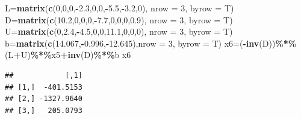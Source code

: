 \documentclass[
]{article}
\newenvironment{Shaded}{\begin{snugshade}}{\end{snugshade}}
\newcommand{\AttributeTok}[1]{\textcolor[rgb]{0.13,0.29,0.53}{#1}}
\newcommand{\DecValTok}[1]{\textcolor[rgb]{0.00,0.00,0.81}{#1}}
\newcommand{\FloatTok}[1]{\textcolor[rgb]{0.00,0.00,0.81}{#1}}
\newcommand{\FunctionTok}[1]{\textcolor[rgb]{0.13,0.29,0.53}{\textbf{#1}}}
\newcommand{\NormalTok}[1]{#1}
\newcommand{\OtherTok}[1]{\textcolor[rgb]{0.56,0.35,0.01}{#1}}
\newcommand{\SpecialCharTok}[1]{\textcolor[rgb]{0.81,0.36,0.00}{\textbf{#1}}}
\begin{document}
\begin{Shaded}
\begin{Highlighting}[]
\NormalTok{  L}\OtherTok{=}\FunctionTok{matrix}\NormalTok{(}\FunctionTok{c}\NormalTok{(}\DecValTok{0}\NormalTok{,}\DecValTok{0}\NormalTok{,}\DecValTok{0}\NormalTok{,}\SpecialCharTok{{-}}\FloatTok{2.3}\NormalTok{,}\DecValTok{0}\NormalTok{,}\DecValTok{0}\NormalTok{,}\SpecialCharTok{{-}}\FloatTok{5.5}\NormalTok{,}\SpecialCharTok{{-}}\FloatTok{3.2}\NormalTok{,}\DecValTok{0}\NormalTok{), }\AttributeTok{nrow =} \DecValTok{3}\NormalTok{, }\AttributeTok{byrow =}\NormalTok{ T)}
\NormalTok{  D}\OtherTok{=}\FunctionTok{matrix}\NormalTok{(}\FunctionTok{c}\NormalTok{(}\FloatTok{10.2}\NormalTok{,}\DecValTok{0}\NormalTok{,}\DecValTok{0}\NormalTok{,}\DecValTok{0}\NormalTok{,}\SpecialCharTok{{-}}\FloatTok{7.7}\NormalTok{,}\DecValTok{0}\NormalTok{,}\DecValTok{0}\NormalTok{,}\DecValTok{0}\NormalTok{,}\FloatTok{0.9}\NormalTok{), }\AttributeTok{nrow =} \DecValTok{3}\NormalTok{, }\AttributeTok{byrow =}\NormalTok{ T)}
\NormalTok{  U}\OtherTok{=}\FunctionTok{matrix}\NormalTok{(}\FunctionTok{c}\NormalTok{(}\DecValTok{0}\NormalTok{,}\FloatTok{2.4}\NormalTok{,}\SpecialCharTok{{-}}\FloatTok{4.5}\NormalTok{,}\DecValTok{0}\NormalTok{,}\DecValTok{0}\NormalTok{,}\FloatTok{11.1}\NormalTok{,}\DecValTok{0}\NormalTok{,}\DecValTok{0}\NormalTok{,}\DecValTok{0}\NormalTok{), }\AttributeTok{nrow =} \DecValTok{3}\NormalTok{, }\AttributeTok{byrow =}\NormalTok{ T)}
\NormalTok{  b}\OtherTok{=}\FunctionTok{matrix}\NormalTok{(}\FunctionTok{c}\NormalTok{(}\FloatTok{14.067}\NormalTok{,}\SpecialCharTok{{-}}\FloatTok{0.996}\NormalTok{,}\SpecialCharTok{{-}}\FloatTok{12.645}\NormalTok{),}\AttributeTok{nrow =} \DecValTok{3}\NormalTok{, }\AttributeTok{byrow =}\NormalTok{ T)}
\NormalTok{  x6}\OtherTok{=}\NormalTok{(}\SpecialCharTok{{-}}\FunctionTok{inv}\NormalTok{(D))}\SpecialCharTok{\%*\%}\NormalTok{(L}\SpecialCharTok{+}\NormalTok{U)}\SpecialCharTok{\%*\%}\NormalTok{x5}\SpecialCharTok{+}\FunctionTok{inv}\NormalTok{(D)}\SpecialCharTok{\%*\%}\NormalTok{b}
\NormalTok{  x6}
\end{Highlighting}
\end{Shaded}

\begin{verbatim}
##            [,1]
## [1,]  -401.5153
## [2,] -1327.9640
## [3,]   205.0793
\end{verbatim}
\end{document}
